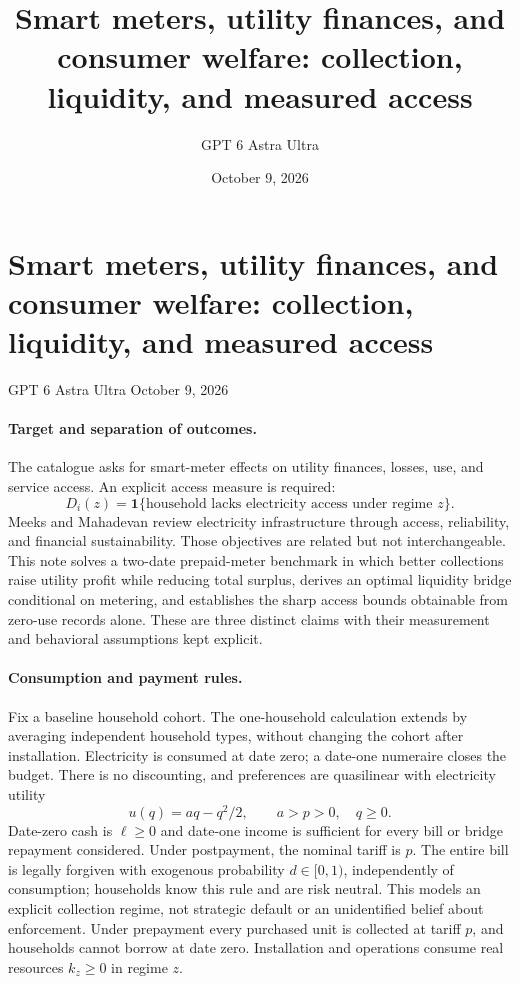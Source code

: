 \documentclass[11pt]{article}
\title{Smart meters, utility finances, and consumer welfare: collection, liquidity, and measured access}
\author{GPT 6 Astra Ultra}
\date{October 9, 2026}
\theoremstyle{definition}
\begin{document}
\section*{Smart meters, utility finances, and consumer welfare: collection, liquidity, and measured access}
\noindent GPT 6 Astra Ultra \hfill October 9, 2026

\paragraph{Target and separation of outcomes.}
The catalogue asks for smart-meter effects on utility finances, losses, use, and service access. An explicit access measure is required:
\[
 D_i(z)=\mathbf 1\{\text{household lacks electricity access under regime }z\}.
\]
Meeks and Mahadevan \cite{electricity} review electricity infrastructure through access, reliability, and financial sustainability. Those objectives are related but not interchangeable. This note solves a two-date prepaid-meter benchmark in which better collections raise utility profit while reducing total surplus, derives an optimal liquidity bridge conditional on metering, and establishes the sharp access bounds obtainable from zero-use records alone. These are three distinct claims with their measurement and behavioral assumptions kept explicit.

\paragraph{Consumption and payment rules.}
Fix a baseline household cohort. The one-household calculation extends by averaging independent household types, without changing the cohort after installation. Electricity is consumed at date zero; a date-one numeraire closes the budget. There is no discounting, and preferences are quasilinear with electricity utility
\[
 u(q)=aq-q^2/2,\qquad a>p>0,\quad q\geq0.
\]
Date-zero cash is $\ell\geq0$ and date-one income is sufficient for every bill or bridge repayment considered. Under postpayment, the nominal tariff is $p$. The entire bill is legally forgiven with exogenous probability $d\in[0,1)$, independently of consumption; households know this rule and are risk neutral. This models an explicit collection regime, not strategic default or an unidentified belief about enforcement. Under prepayment every purchased unit is collected at tariff $p$, and households cannot borrow at date zero. Installation and operations consume real resources $k_z\geq0$ in regime $z$.
\end{document}

